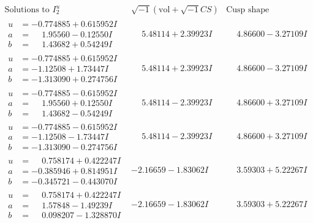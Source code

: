 \documentclass[1p]{elsarticle_modified}
\theoremstyle{definition}
\newcommand{\I}{\sqrt{-1}}
\begin{document}
$$\begin{array}{c|c|c}  
\text{Solutions to }I^u_{2}& \I (\text{vol} + \sqrt{-1}CS) & \text{Cusp shape}\\
 \hline 
\begin{aligned}
u &= -0.774885 + 0.615952 I \\
a &= \phantom{-}1.95560 - 0.12550 I \\
b &= \phantom{-}1.43682 + 0.54249 I\end{aligned}
 & \phantom{-}5.48114 + 2.39923 I & \phantom{-}4.86600 - 3.27109 I \\ \hline\begin{aligned}
u &= -0.774885 + 0.615952 I \\
a &= -1.12508 + 1.73447 I \\
b &= -1.313090 + 0.274756 I\end{aligned}
 & \phantom{-}5.48114 + 2.39923 I & \phantom{-}4.86600 - 3.27109 I \\ \hline\begin{aligned}
u &= -0.774885 - 0.615952 I \\
a &= \phantom{-}1.95560 + 0.12550 I \\
b &= \phantom{-}1.43682 - 0.54249 I\end{aligned}
 & \phantom{-}5.48114 - 2.39923 I & \phantom{-}4.86600 + 3.27109 I \\ \hline\begin{aligned}
u &= -0.774885 - 0.615952 I \\
a &= -1.12508 - 1.73447 I \\
b &= -1.313090 - 0.274756 I\end{aligned}
 & \phantom{-}5.48114 - 2.39923 I & \phantom{-}4.86600 + 3.27109 I \\ \hline\begin{aligned}
u &= \phantom{-}0.758174 + 0.422247 I \\
a &= -0.385946 + 0.814951 I \\
b &= -0.345721 - 0.443070 I\end{aligned}
 & -2.16659 - 1.83062 I & \phantom{-}3.59303 + 5.22267 I \\ \hline\begin{aligned}
u &= \phantom{-}0.758174 + 0.422247 I \\
a &= \phantom{-}1.57848 - 1.49239 I \\
b &= \phantom{-}0.098207 - 1.328870 I\end{aligned}
 & -2.16659 - 1.83062 I & \phantom{-}3.59303 + 5.22267 I \\ \hline\begin{aligned}

\end{aligned}
\end{array}$$
\end{document}
